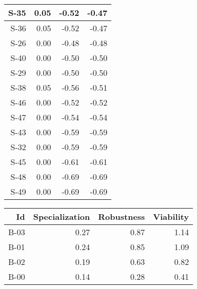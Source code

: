 \begin{tabular}{ | r | r | r | r | }
    \hline
                  S-35  &            0.05  &           -0.52  &           -0.47  \\
    \hline
                  S-36  &            0.05  &           -0.52  &           -0.47  \\
    \hline
                  S-26  &            0.00  &           -0.48  &           -0.48  \\
    \hline
                  S-40  &            0.00  &           -0.50  &           -0.50  \\
    \hline
                  S-29  &            0.00  &           -0.50  &           -0.50  \\
    \hline
                  S-38  &            0.05  &           -0.56  &           -0.51  \\
    \hline
                  S-46  &            0.00  &           -0.52  &           -0.52  \\
    \hline
                  S-47  &            0.00  &           -0.54  &           -0.54  \\
    \hline
                  S-43  &            0.00  &           -0.59  &           -0.59  \\
    \hline
                  S-32  &            0.00  &           -0.59  &           -0.59  \\
    \hline
                  S-45  &            0.00  &           -0.61  &           -0.61  \\
    \hline
                  S-48  &            0.00  &           -0.69  &           -0.69  \\
    \hline
                  S-49  &            0.00  &           -0.69  &           -0.69  \\
    \hline
\end{tabular}


\begin{tabular}{ | r | r | r | r | }
    \hline
                    Id  &  Specialization  &      Robustness  &       Viability  \\
    \hline
    \hline
                  B-03  &            0.27  &            0.87  &            1.14  \\
    \hline
                  B-01  &            0.24  &            0.85  &            1.09  \\
    \hline
                  B-02  &            0.19  &            0.63  &            0.82  \\
    \hline
                  B-00  &            0.14  &            0.28  &            0.41  \\
    \hline
\end{tabular}


